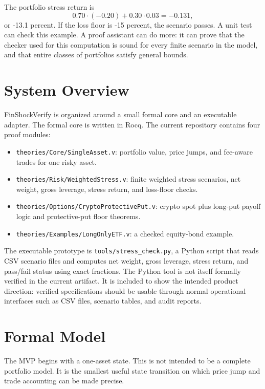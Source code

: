\documentclass[11pt]{article}
\begin{document}
The portfolio stress return is
\[
  0.70 \cdot (-0.20) + 0.30 \cdot 0.03 = -0.131,
\]
or -13.1 percent. If the loss floor is -15 percent, the scenario passes. A
unit test can check this example. A proof assistant can do more: it can prove
that the checker used for this computation is sound for every finite scenario
in the model, and that entire classes of portfolios satisfy general bounds.

\section{System Overview}

FinShockVerify is organized around a small formal core and an executable
adapter. The formal core is written in Rocq. The current repository contains
four proof modules:

\begin{itemize}
  \item \texttt{theories/Core/SingleAsset.v}: portfolio value, price jumps,
  and fee-aware trades for one risky asset.
  \item \texttt{theories/Risk/WeightedStress.v}: finite weighted stress
  scenarios, net weight, gross leverage, stress return, and loss-floor checks.
  \item \texttt{theories/Options/CryptoProtectivePut.v}: crypto spot plus
  long-put payoff logic and protective-put floor theorems.
  \item \texttt{theories/Examples/LongOnlyETF.v}: a checked equity-bond
  example.
\end{itemize}

The executable prototype is \texttt{tools/stress\_check.py}, a Python script
that reads CSV scenario files and computes net weight, gross leverage, stress
return, and pass/fail status using exact fractions. The Python tool is not
itself formally verified in the current artifact. It is included to show the
intended product direction: verified specifications should be usable through
normal operational interfaces such as CSV files, scenario tables, and audit
reports.

\section{Formal Model}

The MVP begins with a one-asset state. This is not intended to be a complete
portfolio model. It is the smallest useful state transition on which price
jump and trade accounting can be made precise.
\end{document}
